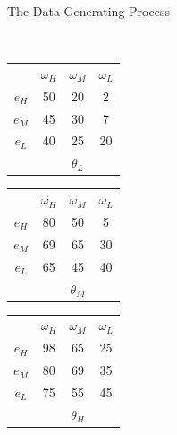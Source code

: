 \documentclass[aspectratio=169]{beamer}
\begin{document}
\begin{frame}{The Data Generating Process}
\begin{center}
\end{center}
\\
\bigskip
\centering
\begin{tabular}{ c|c|c|c|}
  
  \multicolumn{1}{c}{} & \multicolumn{1}{c}{$\omega_H$} & \multicolumn{1}{c}{$\omega_M$} & \multicolumn{1}{c}{$\omega_L$}\\
  \cline{2-4}
  $e_H$ & \cellcolor{blue!25}50 & 20 & 2 \\
  \cline{2-4}
  $e_M$ & 45 & \cellcolor{blue!25}30 & 7 \\
  \cline{2-4}
  $e_L$ & 40 & 25 & \cellcolor{blue!25}20 \\
  \cline{2-4}
  \multicolumn{1}{c}{} & \multicolumn{1}{c}{} & \multicolumn{1}{c}{$\theta_L$} & \multicolumn{1}{c}{}\\
\end{tabular}
\hspace{.3cm} %
\begin{tabular}{ c|c|c|c|}
  
  \multicolumn{1}{c}{} & \multicolumn{1}{c}{$\omega_H$} & \multicolumn{1}{c}{$\omega_M$} & \multicolumn{1}{c}{$\omega_L$}\\
  \cline{2-4}
  $e_H$ & \cellcolor{blue!25}80 & 50 & 5 \\
  \cline{2-4}
  $e_M$ & 69 & \cellcolor{blue!25}65 & 30 \\
  \cline{2-4}
  $e_L$ & 65 & 45 & \cellcolor{blue!25}40 \\
  \cline{2-4}
  \multicolumn{1}{c}{} & \multicolumn{1}{c}{} & \multicolumn{1}{c}{$\theta_M$} & \multicolumn{1}{c}{}\\
\end{tabular}
\hspace{.3cm} %
\begin{tabular}{ c|c|c|c|}
  
  \multicolumn{1}{c}{} & \multicolumn{1}{c}{$\omega_H$} & \multicolumn{1}{c}{$\omega_M$} & \multicolumn{1}{c}{$\omega_L$}\\
  \cline{2-4}
  $e_H$ & \cellcolor{blue!25}98 & 65 & 25 \\
  \cline{2-4}
  $e_M$ & 80 & \cellcolor{blue!25}69 & 35 \\
  \cline{2-4}
  $e_L$ & 75 & 55 & \cellcolor{blue!25}45 \\
  \cline{2-4}
  \multicolumn{1}{c}{} & \multicolumn{1}{c}{} & \multicolumn{1}{c}{$\theta_H$} & \multicolumn{1}{c}{}\\
\end{tabular}

\begin{center}
  \end{center}
    
\end{frame}
\end{document}
